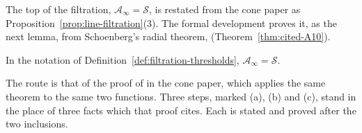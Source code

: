 The top of the filtration, $\mathcal{A}_\infty = \mathcal{S}$, is restated from the cone paper as
Proposition~\ref{prop:line-filtration}(3). The formal development proves it, as the next lemma,
from Schoenberg's radial theorem,  (Theorem~\ref{thm:cited-A10}).

\begin{lemma}\label{lem:filtration-top}
In the notation of Definition~\ref{def:filtration-thresholds}, $\mathcal{A}_\infty = \mathcal{S}$.
\end{lemma}

The route is that of the proof of  in the cone paper, which applies the
same theorem to the same two functions. Three steps, marked (a), (b) and (c), stand in the place
of three facts which that proof cites. Each is stated and proved after the two inclusions.

